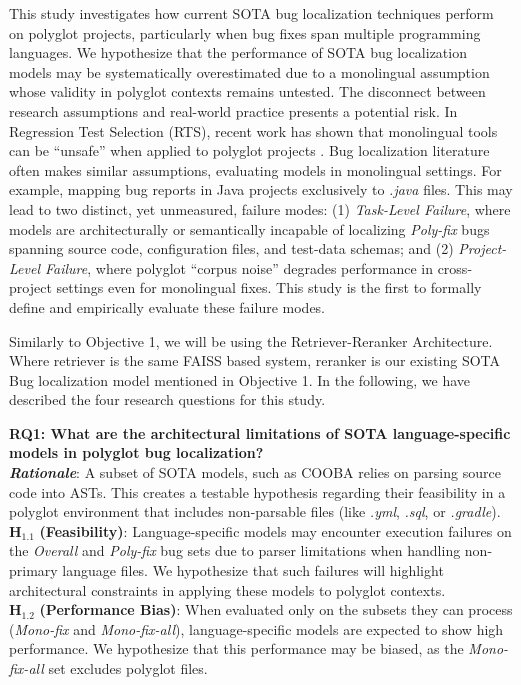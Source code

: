 \documentclass[12pt,table,xcdraw]{article}
\begin{document}
This study investigates how current SOTA bug localization techniques perform on polyglot projects, particularly when bug fixes span multiple programming languages. We hypothesize that the performance of SOTA bug localization models may be systematically overestimated due to a monolingual assumption whose validity in polyglot contexts remains untested. The disconnect between research assumptions and real-world practice presents a potential risk. In Regression Test Selection (RTS), recent work has shown that monolingual tools can be ``unsafe'' when applied to polyglot projects \cite{maurina2025babelrts}. Bug localization literature often makes similar assumptions, evaluating models in monolingual settings. For example, mapping bug reports in Java projects exclusively to \textit{.java} files. This may lead to two distinct, yet unmeasured, failure modes: (1) \textit{Task-Level Failure}, where models are architecturally or semantically incapable of localizing \textit{Poly-fix} bugs spanning source code, configuration files, and test-data schemas; and (2) \textit{Project-Level Failure}, where polyglot ``corpus noise'' degrades performance in cross-project settings even for monolingual fixes. This study is the first to formally define and empirically evaluate these failure modes.

Similarly to Objective 1, we will be using the Retriever-Reranker Architecture. Where retriever is the same FAISS based system, reranker is our existing SOTA Bug localization model mentioned in Objective 1. In the following, we have described the four research questions for this study. 

\textbf{RQ1: What are the architectural limitations of SOTA language-specific models in polyglot bug localization?} \\
\textit{\textbf{Rationale}}: A subset of SOTA models, such as COOBA relies on parsing source code into ASTs. This creates a testable hypothesis regarding their feasibility in a polyglot environment that includes non-parsable files (like \textit{.yml}, \textit{.sql}, or \textit{.gradle}). \\
$\boldsymbol{H_{1.1}}$ \textbf{(Feasibility)}: Language-specific models may encounter execution failures on the \textit{Overall} and \textit{Poly-fix} bug sets due to parser limitations when handling non-primary language files. We hypothesize that such failures will highlight architectural constraints in applying these models to polyglot contexts. \\
$\boldsymbol{H_{1.2}}$ \textbf{(Performance Bias)}: When evaluated only on the subsets they can process (\textit{Mono-fix} and \textit{Mono-fix-all}), language-specific models are expected to show high performance. We hypothesize that this performance may be biased, as the \textit{Mono-fix-all} set excludes polyglot files.
\end{document}
